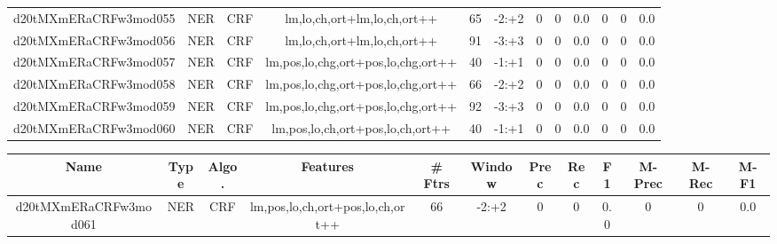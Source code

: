\documentclass[a4paper]{article}
\begin{document}
\begin{landscape}
\begin{center}
\begin{tabular}{ |c|c|c|c|c|c|c|c|c|c|c|c|}
 
 	
 	\small{ d20tMXmERaCRFw3mod055 } & \small{ NER} & \small{  CRF }  & lm,lo,ch,ort+lm,lo,ch,ort++  &  65 &  \small{  -2:+2 }  &  0 & 0 & 0.0  &  0 & 0 & 0.0 \\
 	

 
 	
 	\small{ d20tMXmERaCRFw3mod056 } & \small{ NER} & \small{  CRF }  & lm,lo,ch,ort+lm,lo,ch,ort++  &  91 &  \small{  -3:+3 }  &  0 & 0 & 0.0  &  0 & 0 & 0.0 \\
 	

 
 	
 	\small{ d20tMXmERaCRFw3mod057 } & \small{ NER} & \small{  CRF }  & lm,pos,lo,chg,ort+pos,lo,chg,ort++  &  40 &  \small{  -1:+1 }  &  0 & 0 & 0.0  &  0 & 0 & 0.0 \\
 	

 
 	
 	\small{ d20tMXmERaCRFw3mod058 } & \small{ NER} & \small{  CRF }  & lm,pos,lo,chg,ort+pos,lo,chg,ort++  &  66 &  \small{  -2:+2 }  &  0 & 0 & 0.0  &  0 & 0 & 0.0 \\
 	

 
 	
 	\small{ d20tMXmERaCRFw3mod059 } & \small{ NER} & \small{  CRF }  & lm,pos,lo,chg,ort+pos,lo,chg,ort++  &  92 &  \small{  -3:+3 }  &  0 & 0 & 0.0  &  0 & 0 & 0.0 \\
 	

 
 	
 	\small{ d20tMXmERaCRFw3mod060 } & \small{ NER} & \small{  CRF }  & lm,pos,lo,ch,ort+pos,lo,ch,ort++  &  40 &  \small{  -1:+1 }  &  0 & 0 & 0.0  &  0 & 0 & 0.0 \\
 	
 \hline
\end{tabular}
\end{center}




\begin{center}
\begin{tabular}{ |c|c|c|c|c|c|c|c|c|c|c|c|} 
 \hline
 	Name & Type & Algo. & Features & \# Ftrs & Window & Prec & Rec & F1 & M-Prec & M-Rec & M-F1\\
 \hline

 	

 
 	
 	\small{ d20tMXmERaCRFw3mod061 } & \small{ NER} & \small{  CRF }  & lm,pos,lo,ch,ort+pos,lo,ch,ort++  &  66 &  \small{  -2:+2 }  &  0 & 0 & 0.0  &  0 & 0 & 0.0 \\
 	


\end{tabular}
\end{center}
\end{landscape}
\end{document}
